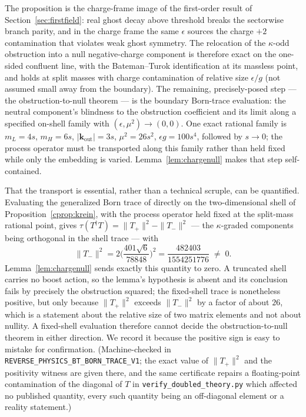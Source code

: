\documentclass[11pt]{article}
\theoremstyle{definition}
\theoremstyle{remark}
\newcommand{\dg}{\dagger}
\begin{document}
The proposition is the charge-frame image of the first-order result of
Section~\ref{sec:firstfield}: real ghost decay above threshold breaks
the sectorwise branch parity, and in the charge frame the same
$\epsilon$ sources the charge $+2$ contamination that violates weak
ghost symmetry.  The relocation of the $\kappa$-odd obstruction into a
null negative-charge component is therefore exact on the one-sided
confluent line, with the Bateman--Turok identification at its massless
point, and holds at split masses with charge contamination of relative
size $\epsilon/g$ (not assumed small away from the boundary).  The
remaining, precisely-posed step --- the obstruction-to-null theorem ---
is the boundary Born-trace evaluation: the neutral component's
blindness to the obstruction coefficient and its limit along a
specified on-shell family with $(\epsilon,\mu^2)\to(0,0)$.
One exact rational family is
$m_L=4s$, $m_H=6s$, $|\mathbf k_{\mathrm{out}}|=3s$,
$\mu^2=26s^2$, $\epsilon g=100s^4$, followed by $s\to0$; the process
operator must be transported along this family rather than held fixed
while only the embedding is varied.
Lemma~\ref{lem:chargenull} makes that step self-contained.

That the transport is essential, rather than a technical scruple, can be
quantified.  Evaluating the generalized Born trace of \cite{BT2026}
directly on the two-dimensional shell of
Proposition~\ref{cprop:krein}, with the process operator held fixed at
the split-mass rational point, gives
$\tau(T^{\dg}T)=\|T_+\|^2-\|T_-\|^2$ --- the $\kappa$-graded components
being orthogonal in the shell trace --- with
\begin{equation}
\|T_-\|^2=2\Big(\frac{401\sqrt6}{78848}\Big)^{2}
=\frac{482403}{1554251776}\;\neq\;0 .
\end{equation}
Lemma~\ref{lem:chargenull} sends exactly this quantity to zero.  A
truncated shell carries no boost action, so the lemma's hypothesis is
absent and its conclusion fails by precisely the obstruction squared;
the fixed-shell trace is nonetheless positive, but only because
$\|T_+\|^2$ exceeds $\|T_-\|^2$ by a factor of about $26$, which is a
statement about the relative size of two matrix elements and not about
nullity.  A fixed-shell evaluation therefore cannot decide the
obstruction-to-null theorem in either direction.  We record it because
the positive sign is easy to mistake for confirmation.
(Machine-checked in
\texttt{REVERSE\_PHYSICS\_BT\_BORN\_TRACE\_V1}; the exact value of
$\|T_+\|^2$ and the positivity witness are given there, and the same
certificate repairs a floating-point contamination of the diagonal of
$T$ in \texttt{verify\_doubled\_theory.py} which affected no published
quantity, every such quantity being an off-diagonal element or a
reality statement.)
\end{document}
